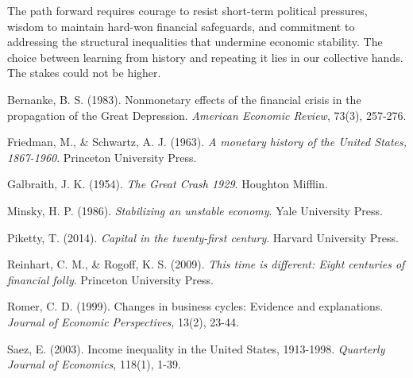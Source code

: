 \documentclass[12pt,letterpaper]{article}
\begin{document}
The path forward requires courage to resist short-term political pressures, wisdom to maintain hard-won financial safeguards, and commitment to addressing the structural inequalities that undermine economic stability. The choice between learning from history and repeating it lies in our collective hands. The stakes could not be higher.

\begin{thebibliography}{99}

Bernanke, B. S. (1983). Nonmonetary effects of the financial crisis in the propagation of the Great Depression. \textit{American Economic Review}, 73(3), 257-276.

Friedman, M., \& Schwartz, A. J. (1963). \textit{A monetary history of the United States, 1867-1960}. Princeton University Press.

Galbraith, J. K. (1954). \textit{The Great Crash 1929}. Houghton Mifflin.

Minsky, H. P. (1986). \textit{Stabilizing an unstable economy}. Yale University Press.

Piketty, T. (2014). \textit{Capital in the twenty-first century}. Harvard University Press.

Reinhart, C. M., \& Rogoff, K. S. (2009). \textit{This time is different: Eight centuries of financial folly}. Princeton University Press.

Romer, C. D. (1999). Changes in business cycles: Evidence and explanations. \textit{Journal of Economic Perspectives}, 13(2), 23-44.

Saez, E. (2003). Income inequality in the United States, 1913-1998. \textit{Quarterly Journal of Economics}, 118(1), 1-39.

\end{thebibliography}
\end{document}
